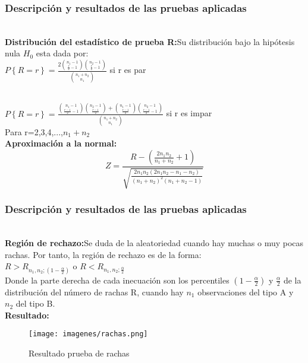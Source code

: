 \documentclass[12pt]{beamer}
\begin{document}
\begin{frame}
\frametitle{Descripción y resultados de las pruebas aplicadas}
~\\ \textbf{Distribución del estadístico de prueba R:}Su distribución bajo la hipótesis nula $H_{0}$ esta dada por:
~\\$P\left\lbrace{R=r}\right\rbrace=\frac{2\binom{n_{1}-1}{\frac{r}{2}-1}\binom{n_{2}-1}{\frac{r}{2}-1}}{\binom{n_{1}+n_{2}}{n_{1}}}$ si r es par

~\\$P\left\lbrace{R=r}\right\rbrace=\frac{\binom{n_{1}-1}{\frac{r-1}{2}-1}\binom{n_{2}-1}{\frac{r-1}{2}}+\binom{n_{1}-1}{\frac{r-1}{2}}\binom{n_{2}-1}{\frac{r-1}{2}-1}}{\binom{n_{1}+n_{2}}{n_{1}}}$ si r es impar
~\\Para r=2,3,4,...,$n_{1}+n_{2}$
~\\ \textbf{Aproximación a la normal:}
$$Z=\frac{R-\left(\frac{2n_{1}n_{2}}{n_{1}+n_{2}}+1\right)}{\sqrt{\frac{2n_{1}n_{2}(2n_{1}n_{2}-n_{1}-n_{2})}{(n_{1}+n_{2})^2 (n_{1}+n_{2}-1)}}} $$
\end{frame}

\begin{frame}
\frametitle{Descripción y resultados de las pruebas aplicadas}
~\\ \textbf{Región de rechazo:}Se duda de la aleatoriedad cuando hay muchas o muy pocas rachas. Por tanto, la región de rechazo es de la forma:
~\\ $R>R_{n_{1},n_{2};(1-\frac{\alpha}{2})}$ o $R<R_{n_{1},n_{2};\frac{\alpha}{2}}$
~\\Donde la parte derecha de cada inecuación son los percentiles $(1-\frac{\alpha}{2})$ y $\frac{\alpha}{2}$ de la distribución del número de rachas R, cuando hay $n_{1}$ observaciones del tipo A y $n_{2}$ del tipo B.
~\\ \textbf{Resultado:}
\begin{figure}[!h]
    \begin{center}
        \texttt{[image: imagenes/rachas.png]}
        \caption{Resultado prueba de rachas}
        \label{fig:Densidad}
    \end{center}
\end{figure}
\end{frame}
\end{document}
